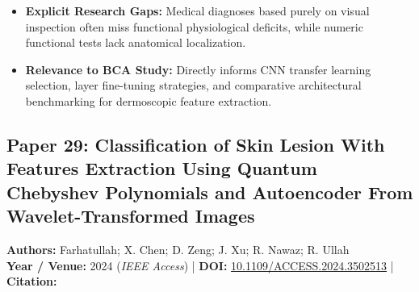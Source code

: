 \documentclass[11pt,a4paper]{article}
\begin{document}
\begin{itemize}
\item \textbf{Explicit Research Gaps:} Medical diagnoses based purely on visual inspection often miss functional physiological deficits, while numeric functional tests lack anatomical localization.
\item \textbf{Relevance to BCA Study:} Directly informs CNN transfer learning selection, layer fine-tuning strategies, and comparative architectural benchmarking for dermoscopic feature extraction.
\end{itemize}

\subsection{Paper 29: Classification of Skin Lesion With Features Extraction Using Quantum Chebyshev Polynomials and Autoencoder From Wavelet-Transformed Images}
\textbf{Authors:} Farhatullah; X. Chen; D. Zeng; J. Xu; R. Nawaz; R. Ullah \\
\textbf{Year / Venue:} 2024 (\textit{IEEE Access}) | \textbf{DOI:} \href{https://doi.org/10.1109/ACCESS.2024.3502513}{10.1109/ACCESS.2024.3502513} | \textbf{Citation:} \cite{10757392}
\end{document}
